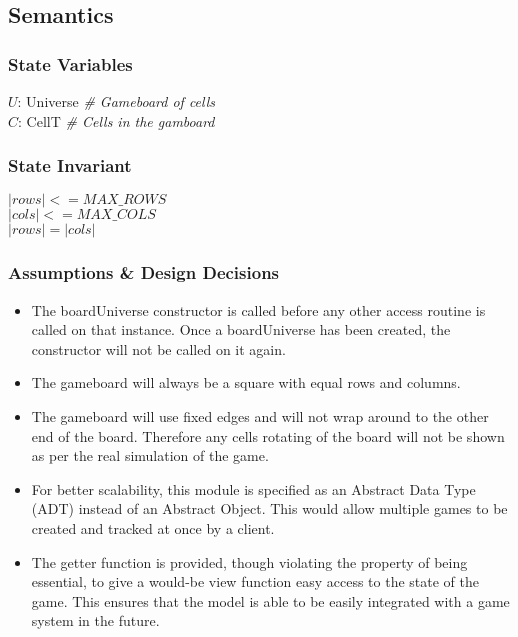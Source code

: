 \documentclass[12pt]{article}
\begin{document}
\subsection* {Semantics}

\subsubsection* {State Variables}

$U$: Universe \textit{\# Gameboard of cells}\\
$C$: CellT \textit{\# Cells in the gamboard}\\

\subsubsection* {State Invariant}

$|rows| <= MAX\_ROWS$\\
$|cols| <= MAX\_COLS$\\
$|rows| = |cols|$\\

\subsubsection* {Assumptions \& Design Decisions}

\begin{itemize}

\item The boardUniverse constructor is called before any other access
  routine is called on that instance. Once a boardUniverse has been created, the
  constructor will not be called on it again.

\item The gameboard will always be a square with equal rows and columns.

\item The gameboard will use fixed edges and will not wrap around to the other
  end of the board. Therefore any cells rotating of the board will not be shown as
  per the real simulation of the game.

\item For better scalability, this module is specified as an Abstract Data Type
  (ADT) instead of an Abstract Object. This would allow multiple games to be
  created and tracked at once by a client.

\item The getter function is provided, though violating the property of being
  essential, to give a would-be view function easy access to the state of the
  game. This ensures that the model is able to be easily integrated with a game
  system in the future.

\end{itemize}
\end{document}
